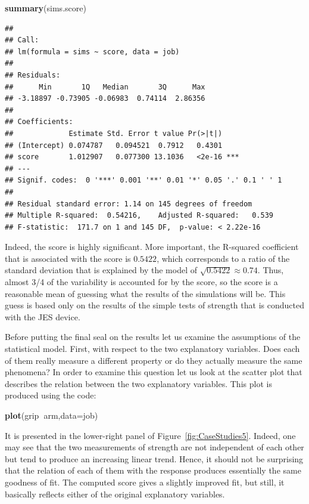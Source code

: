 \documentclass[]{krantz}
\makeatletter
\newenvironment{Shaded}{\begin{snugshade}}{\end{snugshade}}
\newcommand{\DataTypeTok}[1]{\textcolor[rgb]{0.13,0.29,0.53}{#1}}
\newcommand{\KeywordTok}[1]{\textcolor[rgb]{0.13,0.29,0.53}{\textbf{#1}}}
\newcommand{\NormalTok}[1]{#1}
\newcommand{\OperatorTok}[1]{\textcolor[rgb]{0.81,0.36,0.00}{\textbf{#1}}}
\newenvironment{kframe}{%
\medskip{}
\setlength{\fboxsep}{.8em}
 \def\at@end@of@kframe{}%
 \ifinner\ifhmode%
  \def\at@end@of@kframe{\end{minipage}}%
  \begin{minipage}{\columnwidth}%
 \fi\fi%
 \def\FrameCommand##1{\hskip\@totalleftmargin \hskip-\fboxsep
 \colorbox{shadecolor}{##1}\hskip-\fboxsep
     \hskip-\linewidth \hskip-\@totalleftmargin \hskip\columnwidth}%
 \MakeFramed {\advance\hsize-\width
   \@totalleftmargin\z@ \linewidth\hsize
   \@setminipage}}%
 {\par\unskip\endMakeFramed%
 \at@end@of@kframe}
\renewenvironment{Shaded}{\begin{kframe}}{\end{kframe}}
\theoremstyle{definition}
\theoremstyle{definition}
\theoremstyle{definition}
\theoremstyle{remark}
\makeatother
\begin{document}
\begin{Shaded}
\begin{Highlighting}[]
\KeywordTok{summary}\NormalTok{(sims.score)}
\end{Highlighting}
\end{Shaded}

\begin{verbatim}
## 
## Call:
## lm(formula = sims ~ score, data = job)
## 
## Residuals:
##      Min       1Q   Median       3Q      Max 
## -3.18897 -0.73905 -0.06983  0.74114  2.86356 
## 
## Coefficients:
##             Estimate Std. Error t value Pr(>|t|)    
## (Intercept) 0.074787   0.094521  0.7912   0.4301    
## score       1.012907   0.077300 13.1036   <2e-16 ***
## ---
## Signif. codes:  0 '***' 0.001 '**' 0.01 '*' 0.05 '.' 0.1 ' ' 1
## 
## Residual standard error: 1.14 on 145 degrees of freedom
## Multiple R-squared:  0.54216,    Adjusted R-squared:   0.539 
## F-statistic:  171.7 on 1 and 145 DF,  p-value: < 2.22e-16
\end{verbatim}

Indeed, the score is highly significant. More important, the R-squared
coefficient that is associated with the score is \(0.5422\), which
corresponds to a ratio of the standard deviation that is explained by
the model of \(\sqrt{0.5422} \approx 0.74\). Thus, almost 3/4 of the
variability is accounted for by the score, so the score is a reasonable
mean of guessing what the results of the simulations will be. This guess
is based only on the results of the simple tests of strength that is
conducted with the JES device.

Before putting the final seal on the results let us examine the
assumptions of the statistical model. First, with respect to the two
explanatory variables. Does each of them really measure a different
property or do they actually measure the same phenomena? In order to
examine this question let us look at the scatter plot that describes the
relation between the two explanatory variables. This plot is produced
using the code:

\begin{Shaded}
\begin{Highlighting}[]
\KeywordTok{plot}\NormalTok{(grip}\OperatorTok{~}\NormalTok{arm,}\DataTypeTok{data=}\NormalTok{job)}
\end{Highlighting}
\end{Shaded}

It is presented in the lower-right panel of
Figure~\ref{fig:CaseStudies5}. Indeed, one may see that the two
measurements of strength are not independent of each other but tend to
produce an increasing linear trend. Hence, it should not be surprising
that the relation of each of them with the response produces essentially
the same goodness of fit. The computed score gives a slightly improved
fit, but still, it basically reflects either of the original explanatory
variables.
\end{document}
